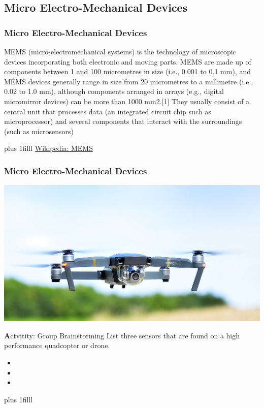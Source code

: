 \documentclass[fleqn]{beamer} %
\newcommand{\sectionIIsubsectionIItitle}{Micro Electro-Mechanical Devices}
\newcommand{\btVFill}{\vskip0pt plus 1filll}
\begin{document}
		\subsection{\sectionIIsubsectionIItitle}\label{sectionIIsubsectionII}

			\begin{frame}
				\frametitle{\sectionIIsubsectionIItitle}
				
				MEMS (micro-electromechanical systems) is the technology of microscopic devices incorporating both electronic and moving parts. MEMS are made up of components between 1 and 100 micrometres in size (i.e., 0.001 to 0.1 mm), and MEMS devices generally range in size from 20 micrometres to a millimetre (i.e., 0.02 to 1.0 mm), although components arranged in arrays (e.g., digital micromirror devices) can be more than 1000 mm2.[1] They usually consist of a central unit that processes data (an integrated circuit chip such as microprocessor) and several components that interact with the surroundings (such as microsensors)
			
				\btVFill
				{\tiny \href{https://en.wikipedia.org/wiki/MEMS}{Wikipedia: MEMS}}

			\end{frame}

			\begin{frame}
				\frametitle{\sectionIIsubsectionIItitle}


				\includegraphics[scale=0.2]{images/Flying_DJI_Mavic_Pro_cropped.jpg}
	
				{\textbf Actvitity:} Group Brainstorming
				List three sensors that are found on a high performance quadcopter or drone.
				\begin{itemize}
					\item
					\item
					\item
				\end{itemize} 

			 	\btVFill


			\end{frame}
\end{document}
